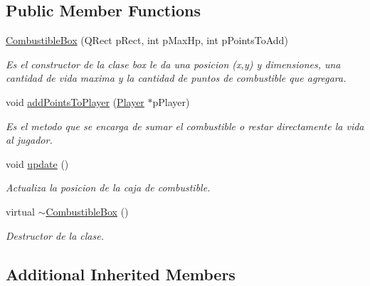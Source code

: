\subsection*{Public Member Functions}
\begin{DoxyCompactItemize}
\item 
\hyperlink{class_combustible_box_abce0b8d39179a5fd5a0fd9076ab25b25}{Combustible\-Box} (Q\-Rect p\-Rect, int p\-Max\-Hp, int p\-Points\-To\-Add)
\begin{DoxyCompactList}\small\item\em Es el constructor de la clase box le da una posicion (x,y) y dimensiones, una cantidad de vida maxima y la cantidad de puntos de combustible que agregara. \end{DoxyCompactList}\item 
void \hyperlink{class_combustible_box_abab14feb7a19ee2a9fc61bbb1a92726a}{add\-Points\-To\-Player} (\hyperlink{class_player}{Player} $\ast$p\-Player)
\begin{DoxyCompactList}\small\item\em Es el metodo que se encarga de sumar el combustible o restar directamente la vida al jugador. \end{DoxyCompactList}\item 
\hypertarget{class_combustible_box_ac3bcbb721576f4b00b0f2d7e48994657}{void \hyperlink{class_combustible_box_ac3bcbb721576f4b00b0f2d7e48994657}{update} ()}\label{class_combustible_box_ac3bcbb721576f4b00b0f2d7e48994657}

\begin{DoxyCompactList}\small\item\em Actualiza la posicion de la caja de combustible. \end{DoxyCompactList}\item 
\hypertarget{class_combustible_box_ae16e87f370101cfcd78e7bd763de4620}{virtual \hyperlink{class_combustible_box_ae16e87f370101cfcd78e7bd763de4620}{$\sim$\-Combustible\-Box} ()}\label{class_combustible_box_ae16e87f370101cfcd78e7bd763de4620}

\begin{DoxyCompactList}\small\item\em Destructor de la clase. \end{DoxyCompactList}\end{DoxyCompactItemize}
\subsection*{Additional Inherited Members}


